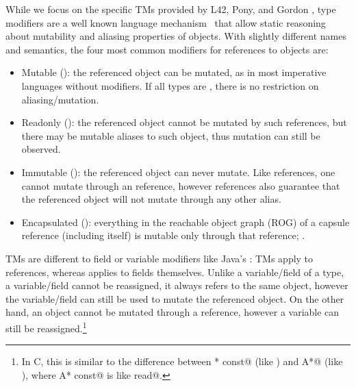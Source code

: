 While we focus on the specific TMs provided by L42, Pony, and Gordon \etal, type modifiers
 are a well known language mechanism~\cite{TschantzErnst05,BirkaErnst04,OstlundEtAl08,clebsch2015deny,GianniniEtAl16,GordonEtAl12}
 that allow static reasoning about mutability and aliasing properties of objects.
With slightly different names and semantics, the four most common modifiers for references to objects are:
\begin{itemize}
\item Mutable (\Q@mut@): the referenced object can be mutated, as in most imperative languages without modifiers.
If all types are \Q@mut@, there is no restriction on aliasing/mutation.
\item Readonly (\Q@read@): the referenced object cannot be mutated by such references, but there may be mutable aliases to such object, thus mutation can still be observed. 
\item Immutable (\Q@imm@): the referenced object can never mutate. Like \Q@read@ references, one cannot mutate through an \Q@imm@ reference, however \Q@imm@ references also guarantee that the referenced object will not mutate through any other alias.
\item Encapsulated (\Q@capsule@):
 everything in the reachable object graph (ROG) of a capsule reference (including itself) is mutable only through that reference; .
\end{itemize}

\noindent TMs are different to field or variable modifiers like Java's \Q@final@: TMs apply to references, whereas \Q@final@ applies to fields themselves. Unlike a variable/field of a \Q@read@ type, a \Q@final@ variable/field cannot be reassigned, it always refers to the same object, however the variable/field can still be used to mutate the referenced object.
On the other hand, an object cannot be mutated through a \Q@read@ reference, however a \Q@read@ variable can still be reassigned.\footnote{In C, this is similar to the difference between \Q@A* const@ (like \Q@final@) and \Q@const A*@ (like \Q@read@), where \Q@const A* const@ is like \Q@final read@.}

